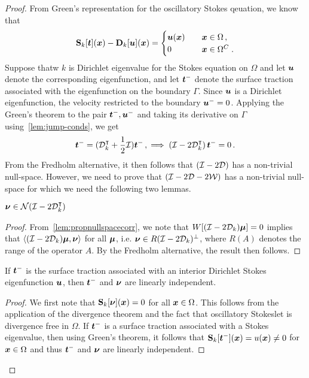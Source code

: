 \begin{proof}
From Green's representation for the oscillatory Stokes qeuation, 
we know that 
  \begin{equation} \label{eq:rep-theorem}
    {\bf S}_{k} [{\boldsymbol t}]({\boldsymbol x}) - {\bf D}_{k}[{\boldsymbol u}]({\boldsymbol x}) = \begin{cases} 
    {\boldsymbol u}({\boldsymbol x}) &\quad {\boldsymbol x} \in \Omega \, , \\
    0 &\quad {\boldsymbol x} \in \Omega^{C} \; .
    \end{cases}
  \end{equation}
Suppose thatw $k$ is Dirichlet eigenvalue for the Stokes equation on $\Omega$
and let ${\boldsymbol u}$ denote the corresponding eigenfunction, and let ${\boldsymbol t}^{-}$ denote
the surface traction associated with the eigenfunction on the boundary $\Gamma$.
Since ${\boldsymbol u}$ is a Dirichlet eigenfunction, the velocity restricted to the boundary
${\boldsymbol u}^{-} = 0$. 
Applying the Green's theorem to the pair ${\boldsymbol t}^{-}, {\boldsymbol u}^{-}$ and taking 
its derivative on $\Gamma$ using~\cref{lem:jump-conds}, we get
\begin{equation}
{\boldsymbol t}^{-} = ({\mathcal D}^{\intercal}_{k} + \frac{1}{2} \mathcal I) {\boldsymbol t}^{-} \, ,\implies \left(\mathcal I - 2{\mathcal D}^{\intercal}_{k} \right) 
{\boldsymbol t}^{-} = 0 \, .
\end{equation}
From the Fredholm alternative, it then follows that $(\mathcal I - 2{\mathcal D})$ has a non-trivial 
null-space.
However, we need to prove that $(\mathcal I -2{\mathcal D} - 2{\mathcal W})$ has a non-trivial null-space
for which we need the following two lemmas.


\begin{lemma}
${\boldsymbol \nu} \in {\mathcal N}(\mathcal I - 2{\mathcal D}^{\intercal}_{k})$
\end{lemma}
\begin{proof}
From~\cref{lem:propnullspacecorr}, we note that
$W[(\mathcal I - 2{\mathcal D}_{k}){\boldsymbol \mu}] =0$ implies that $\left<(\mathcal I -2{\mathcal D}_{k}){\boldsymbol \mu} ,{\boldsymbol \nu} \right>$ for
all ${\boldsymbol \mu}$, i.e. ${\boldsymbol \nu} \in R(\mathcal I - 2{\mathcal D}_{k})^{\perp}$, where
$R(A)$ denotes the range of the operator $A$. 
By the Fredholm alternative, the result then follows.
\end{proof}

\begin{lemma}
If ${\boldsymbol t}^{-}$ is the surface traction associated with an interior Dirichlet
Stokes eigenfunction ${\boldsymbol u}$, then ${\boldsymbol t}^{-}$ and ${\boldsymbol \nu}$ are linearly independent.
\end{lemma}
\begin{proof}
We first note that ${\bf S}_{k}[{\boldsymbol \nu}]({\boldsymbol x}) = 0$ for all ${\boldsymbol x} \in \Omega$.
This follows from the application of the divergence theorem and the fact that
oscillatory Stokeslet is divergence free in $\Omega$. 
If ${\boldsymbol t}^{-}$ is a surface traction associated with a Stokes eigenvalue, then
using Green's theorem, it follows that
${\bf S}_{k}[{\boldsymbol t}^{-}]({\boldsymbol x}) = u({\boldsymbol x}) \neq 0$ for ${\boldsymbol x} \in \Omega$ and
thus ${\boldsymbol t}^{-}$ and ${\boldsymbol \nu}$ are linearly independent.
\end{proof}



\end{proof}
